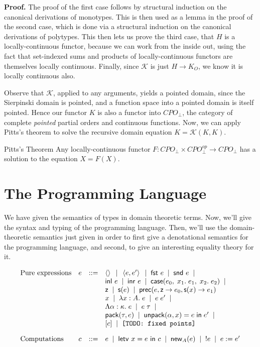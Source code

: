 \documentclass[12pt]{article}
\begin{document}
\textbf{Proof.} The proof of the first case follows by structural
induction on the canonical derivations of monotypes. This is then used
as a lemma in the proof of the second case, which is done via a
structural induction on the canonical derivations of polytypes. This
then lets us prove the third case, that $H$ is a locally-continuous
functor, because we can work from the inside out, using the fact that
set-indexed sums and products of locally-continuous functors are
themselves locally continuous. Finally, since $\mathcal{K}$ is just 
$H \to K_O$, we know it is locally continuous also. 

Observe that $\mathcal{K}$, applied to any arguments, yields a pointed
domain, since the Sierpinski domain is pointed, and a function space
into a pointed domain is itself pointed. Hence our functor $K$ is also
a functor into $CPO_\bot$, the category of complete \emph{pointed}
partial orders and continuous functions. Now, we can apply Pitts's
theorem to solve the recursive domain equation $K = \mathcal{K}(K,
K)$.

\begin{prop}{Pitts's Theorem}
Any locally-continuous functor $F : CPO_\bot \times CPO^{op}_\bot \to CPO_\bot$ has 
a solution to the equation $X = F(X)$. 
\end{prop}


\section{The Programming Language}

We have given the semantics of types in domain theoretic terms. Now,
we'll give the syntax and typing of the programming language. Then,
we'll use the domain-theoretic semantics just given in order to first
give a denotational semantics for the programming language, and
second, to give an interesting equality theory for it. 

\begin{displaymath}
  \begin{array}{llcl}
    \mbox{Pure expressions} & 
     e & ::= & 
         \left<\right> \;\;|\;\;
         \left<{e},{e'}\right> \;\;|\;\;
         \mbox{\textsf{{fst }}} e \;\;|\;\;
         \mbox{\textsf{{snd }}} e \;\;|\;\; 
\\
     &&& \mbox{\textsf{{inl }}}e \;\;|\;\;
         \mbox{\textsf{{inr }}}e \;\;|\;\;
         \mbox{\textsf{{case}}}(e_0,\; {x_1}.\; e_1,\; {x_2}.\; e_2) \;\;|\;\;
\\
     &&& \mbox{\textsf{{z}}} \;\;|\;\; 
         \mbox{\textsf{{s}}}(e) \;\;|\;\; 
         \mbox{\textsf{{prec}}}(e, \mbox{\textsf{{z}}} \to {e_0}, \mbox{\textsf{{s}}}(x) \to {e_1})
\\ 
     &&& x \;\;|\;\; \lambda x:A.\;e \;\;|\;\; e\;e' \;\;|\;\;
\\ 
     &&& \Lambda \alpha:\kappa.\;e \;\;|\;\; e\;\tau \;\;|\;\;
\\ 
     &&& \mbox{\textsf{{pack}}}({\tau}, {e}) \;\;|\;\; \mbox{\textsf{{unpack}}}({\alpha}, {x}) = {e} \;\mbox{\textsf{{in}}}\;{e'} \;\;|\;\;
\\
     &&& [c] \;\;|\;\; \mbox{\texttt{[TODO: {fixed points}]}}
\\[1em]
  \mbox{Computations} & 
    c & ::= & e \;\;|\;\; \mbox{\textsf{{letv }}}x = e\mbox{\textsf{{ in }}}c \;\;|\;\;
              \mbox{\textsf{{new}}}_{A}(e) \;\;|\;\; !e \;\;|\;\; e := e'
\\[1em]
  \end{array}
\end{displaymath}
\end{document}
